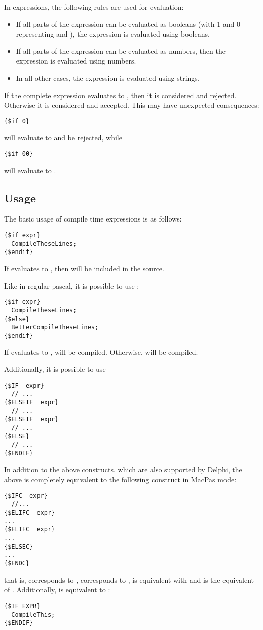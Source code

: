 In expressions, the following rules are used for evaluation:
\begin{itemize}
\item If all parts of the expression can be evaluated as booleans (with 1
and 0 representing  and ), the expression is evaluated
using booleans. 
\item If all parts of the expression can be evaluated as numbers, then the
expression is evaluated using numbers.
\item In all other cases, the expression is evaluated using strings.
\end{itemize}
If the complete expression evaluates to , then it is considered
 and rejected. Otherwise it is considered  and accepted. 
This may have unexpected consequences:
\begin{verbatim}
{$if 0}
\end{verbatim}
will evaluate to  and be rejected, while
\begin{verbatim}
{$if 00}
\end{verbatim}
will evaluate to .

\subsection{Usage}
The basic usage of compile time expressions is as follows:
\begin{verbatim}
{$if expr}
  CompileTheseLines;
{$endif}
\end{verbatim}
If  evaluates to , then  will be
included in the source.

Like in regular pascal, it is possible to use :
\begin{verbatim}
{$if expr}
  CompileTheseLines;
{$else}
  BetterCompileTheseLines;
{$endif}
\end{verbatim}
If  evaluates to ,  will be
compiled. Otherwise,  will be compiled.

Additionally, it is possible to use 
\begin{verbatim}
{$IF  expr}
  // ...
{$ELSEIF  expr}
  // ...
{$ELSEIF  expr}
  // ...
{$ELSE}
  // ...
{$ENDIF}
\end{verbatim}

In addition to the above constructs, which are also supported by Delphi,
the above is completely equivalent to the following construct in MacPas mode:
\begin{verbatim}
{$IFC  expr}
  //...
{$ELIFC  expr}
...
{$ELIFC  expr}
...
{$ELSEC}
...
{$ENDC}
\end{verbatim}
that is,  corresponds to ,  corresponds to
,  is equivalent with  and  is
the equivalent of . Additionally,  is equivalent to
:
\begin{verbatim}
{$IF EXPR}
  CompileThis;
{$ENDIF}
\end{verbatim}

